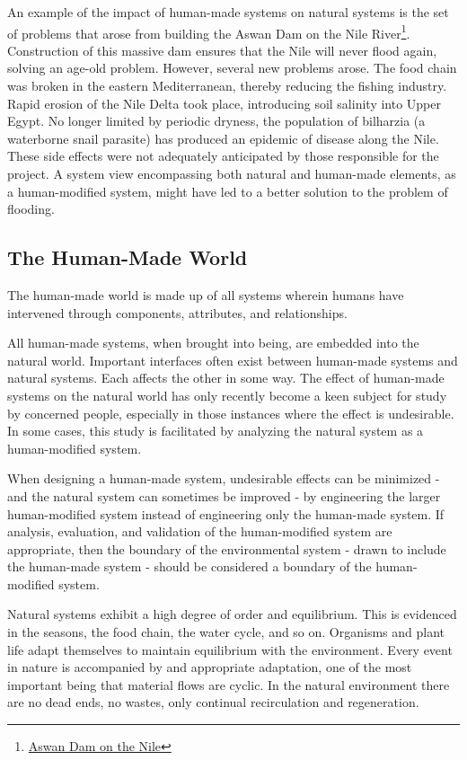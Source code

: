 An example of the impact of human-made systems on natural systems is the set of problems that arose from building the Aswan Dam on the Nile River\footnote{\href{http://www.edc.uri.edu/temp/ci/ciip/FallClass/Docs_2006/UrbanWaterfronts/Abu-Zeid\%20and\%20El-Shibini.pdf}{Aswan Dam on the Nile}}. Construction of this massive dam ensures that the Nile will never flood again, solving an age-old problem. However, several new problems arose. The food chain was broken in the eastern Mediterranean, thereby reducing the fishing industry. Rapid erosion of the Nile Delta took place, introducing soil salinity into Upper Egypt. No longer limited by periodic dryness, the population of bilharzia (a waterborne snail parasite) has produced an epidemic of disease along the Nile. These side effects were not adequately anticipated by those responsible for the project. A system view encompassing both natural and human-made elements, as a human-modified system, might have led to a better solution to the problem of flooding.

\subsection{The Human-Made World}\label{subsec:humanMadeWorld}

The human-made world is made up of all systems wherein humans have intervened through components, attributes, and relationships.

All human-made systems, when brought into being, are embedded into the natural world. Important interfaces often exist between human-made systems and natural systems. Each affects the other in some way. The effect of human-made systems on the natural world has only recently become a keen subject for study by concerned people, especially in those instances where the effect is undesirable. In some cases, this study is facilitated by analyzing the natural system as a human-modified system.

When designing a human-made system, undesirable effects can be minimized - and the natural system can sometimes be improved - by engineering the larger human-modified system instead of engineering only the human-made system. If analysis, evaluation, and validation of the human-modified system are appropriate, then the boundary of the environmental system - drawn to include the human-made system - should be considered a boundary of the human-modified system.
	
Natural systems exhibit a high degree of order and equilibrium. This is evidenced in the seasons, the food chain, the water cycle, and so on. Organisms and plant life adapt themselves to maintain equilibrium with the environment. Every event in nature is accompanied by and appropriate adaptation, one of the most important being that material flows are cyclic. In the natural environment there are no dead ends, no wastes, only continual recirculation and regeneration.

